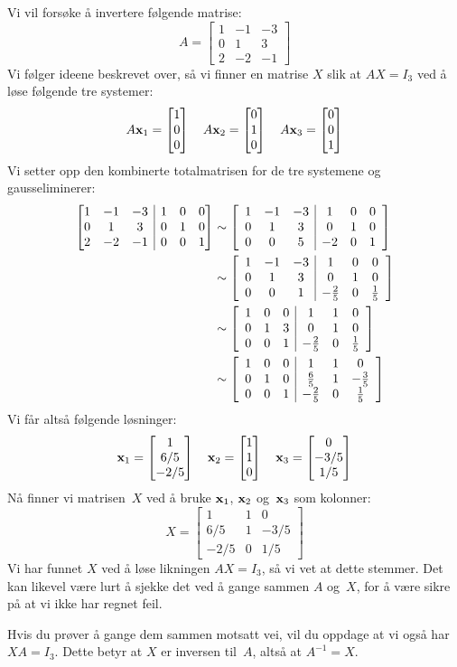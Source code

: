 \begin{ex}
\label{ex:invertering}
Vi vil forsøke å invertere følgende matrise:
\[
A =
\begin{bmatrix}
1 & -1 & -3 \\
0 &  1 &  3 \\
2 & -2 & -1
\end{bmatrix}
\]
Vi følger ideene beskrevet over, så vi finner en matrise $X$ slik at
$AX = I_3$ ved å løse følgende tre systemer:
\[
A \mathbf{x}_1 = \begin{bmatrix} 1 \\ 0 \\ 0 \end{bmatrix}
\quad
A \mathbf{x}_2 = \begin{bmatrix} 0 \\ 1 \\ 0 \end{bmatrix}
\quad
A \mathbf{x}_3 = \begin{bmatrix} 0 \\ 0 \\ 1 \end{bmatrix}
\]
Vi setter opp den kombinerte totalmatrisen for de tre systemene og
gausseliminerer:
\begin{align*}
\left[
\begin{array}{@{}ccc|ccc@{}}
1 & -1 & -3 & 1 & 0 & 0 \\
0 & 1 & 3 & 0 & 1 & 0 \\
2 & -2 & -1 & 0 & 0 & 1
\end{array}
\right]
&
\roweq
\left[
\begin{array}{ccc|ccc}
1 & -1 & -3 & 1 & 0 & 0 \\
0 & 1 & 3 & 0 & 1 & 0 \\
0 & 0 & 5 & -2 & 0 & 1
\end{array}
\right]
\\
&\roweq
\left[
\begin{array}{ccc|ccc}
1 & -1 & -3 & 1 & 0 & 0 \\
0 & 1 & 3 & 0 & 1 & 0 \\
0 & 0 & 1 & -\frac{2}{5} & 0 & \frac{1}{5}
\end{array}
\right]
\\
&\roweq
\left[
\begin{array}{ccc|ccc}
1 & 0 & 0 & 1 & 1 & 0 \\
0 & 1 & 3 & 0 & 1 & 0 \\
0 & 0 & 1 & -\frac{2}{5} & 0 & \frac{1}{5}
\end{array}
\right]
\\
&\roweq
\left[
\begin{array}{ccc|ccc}
1 & 0 & 0 & 1 & 1 & 0 \\
0 & 1 & 0 & \frac{6}{5} & 1 & -\frac{3}{5} \\
0 & 0 & 1 & -\frac{2}{5} & 0 & \frac{1}{5}
\end{array}
\right]
\end{align*}
Vi får altså følgende løsninger:
\[
\mathbf{x}_1 = \begin{bmatrix} 1 \\ 6/5 \\ -2/5 \end{bmatrix}
\quad
\mathbf{x}_2 = \begin{bmatrix} 1 \\ 1 \\ 0 \end{bmatrix}
\quad
\mathbf{x}_3 = \begin{bmatrix} 0 \\ -3/5 \\ 1/5 \end{bmatrix}
\]
Nå finner vi matrisen~$X$ ved å bruke $\mathbf{x}_1$, $\mathbf{x}_2$
og~$\mathbf{x}_3$ som kolonner:
\[
X =
\begin{bmatrix}
1 & 1 & 0 \\
6/5 & 1 & -3/5 \\
-2/5 & 0 & 1/5
\end{bmatrix}
\]
Vi har funnet $X$ ved å løse likningen $AX = I_3$, så vi vet at dette
stemmer.  Det kan likevel være lurt å sjekke det ved å gange sammen
$A$ og~$X$, for å være sikre på at vi ikke har regnet feil.

Hvis du prøver å gange dem sammen motsatt vei, vil du oppdage at vi
også har $XA = I_3$.  Dette betyr at $X$ er inversen til~$A$, altså at
$A^{-1} = X$.
\end{ex}

